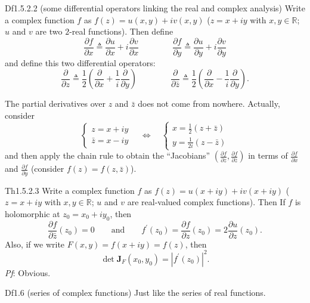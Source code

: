 \documentclass{article}
\newcommand{\parfrac}[2]{\frac{\partial #1}{\partial #2}}
\begin{document}
\begin{Df}{Df1.5.2.2 (some differential operators linking the real and complex analysis)}
    Write a complex function $f$ as $f(z) = u(x, y) + iv(x, y)$ ($z = x+iy$ with $x, y\in\mathbb{R}$; $u$ and $v$ are two $2$-real functions). Then define
    $$ \parfrac{f}{x} \triangleq \parfrac{u}{x} + i\parfrac{v}{x} \qquad \qquad \parfrac{f}{y} \triangleq \parfrac{u}{y} + i\parfrac{v}{y} $$
    and define this two differential operators:
    $$ \parfrac{}{z} \triangleq \frac{1}{2}\left(\parfrac{}{x} + \frac{1}{i}\parfrac{}{y}\right) \qquad \qquad \parfrac{}{\bar{z}} \triangleq \frac{1}{2}\left(\parfrac{}{x} - \frac{1}{i}\parfrac{}{y}\right). $$
\end{Df}

\begin{Rmk}{}
    The partial derivatives over $z$ and $\bar{z}$ does not come from nowhere. Actually, consider
    $$ \begin{cases}
        z = x+iy\\
        \bar{z} = x-iy
    \end{cases} \quad \Leftrightarrow \quad \begin{cases}
        x = \frac{1}{2}(z+\bar{z})\\
        y = \frac{1}{2i}(z-\bar{z})
    \end{cases} $$
    and then apply the chain rule to obtain the ``Jacobians'' $\left(\parfrac{f}{z}, \parfrac{f}{\bar{z}}\right)$ in terms of $\parfrac{f}{x}$ and $\parfrac{f}{y}$ (consider $f(z) = f(z, \bar{z})$).
\end{Rmk}

\begin{Th}{Th1.5.2.3}
    Write a complex function $f$ as $f(z) = u(x+iy) + iv(x+iy)$ ($z = x+iy$ with $x, y\in\mathbb{R}$; $u$ and $v$ are real-valued complex functions). Then
    If $f$ is holomorphic at $z_0 = x_0 + iy_0$, then
    $$ \parfrac{f}{\bar{z}}(z_0) = 0 \qquad \text{and} \qquad f^\prime(z_0) = \parfrac{f}{z}(z_0) = 2\parfrac{u}{z}(z_0). $$
    Also, if we write $F(x, y) = f(x+iy) = f(z)$, then
    $$ \det\pmb{J}_F(x_0, y_0) = |f^\prime(z_0)|^2. $$
    \tcblower
    \textit{Pf}: Obvious.
\end{Th}

\begin{Df}{Df1.6 (series of complex functions)}
    Just like the series of real functions.
\end{Df}
\end{document}
